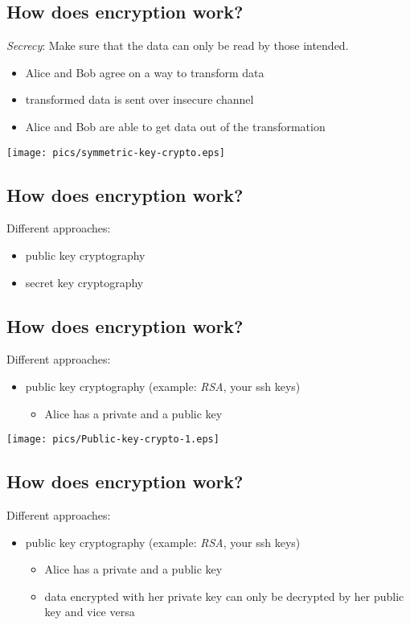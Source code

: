 \documentclass[xga]{xdvislides}
\begin{document}
\subsection{How does encryption work?}
{\em Secrecy}:  Make sure that the data can only be read by those intended.
\begin{itemize}
	\item Alice and Bob agree on a way to transform data
	\item transformed data is sent over insecure channel
	\item Alice and Bob are able to get data out of the transformation
\end{itemize}
\addvspace{.5in}
\begin{center}
	\texttt{[image: pics/symmetric-key-crypto.eps]}
\end{center}

\subsection{How does encryption work?}
Different approaches:
\begin{itemize}
	\item public key cryptography
	\item secret key cryptography
\end{itemize}

\subsection{How does encryption work?}
Different approaches:
\begin{itemize}
	\item public key cryptography (example: {\em RSA}, your ssh keys)
		\begin{itemize}
			\item Alice has a private and a public key
		\end{itemize}
\end{itemize}

\begin{center}
	\texttt{[image: pics/Public-key-crypto-1.eps]}
 \end{center}


\subsection{How does encryption work?}
Different approaches:
\begin{itemize}
	\item public key cryptography (example: {\em RSA}, your ssh keys)
		\begin{itemize}
			\item Alice has a private and a public key
			\item data encrypted with her private key can only be decrypted by
				her public key and vice versa
		\end{itemize}
\end{itemize}
\end{document}

